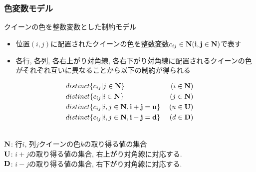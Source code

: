 \begin{frame}
    \frametitle{色変数モデル}
    
    {\footnotesize
        \alert{クイーンの色}を整数変数とした制約モデル\\
        \setlength{\abovedisplayskip}{1pt} %
        \setlength{\belowdisplayskip}{1pt} %
        \begin{block}{}
            \begin{itemize}
                \item 位置$(i, j)$に配置されたクイーンの色を整数変数$c_{ij} \in \bf N (i, j \in \bf N)$で表す
                \item \alert{各行}, \alert{各列}, \alert{各右上がり対角線}, \alert{各右下がり対角線}に配置されるクイーンの色がそれぞれ互いに異なることから以下の制約が得られる
            \end{itemize}
            \vspace{-0.5\baselineskip}           %
            \begin{eqnarray*}
& distinct\{c_{ij} | j \in \bf N\} \; & (i \in \bf N)\\
& distinct\{c_{ij} | i \in \bf N\} \; & (j \in \bf N)\\
& distinct\{c_{ij} | i, j \in \bf N,  i+j=u\} \; & (u \in \bf U)\\
& distinct\{c_{ij} | i, j \in \bf N,  i-j=d\} \; & (d \in \bf D)
            \end{eqnarray*}
        \end{block}
    }
    \\
    {\tiny
        $\bf N$: 行$i$, 列$j$クイーンの色$k$の取り得る値の集合\\
        $\bf U$: $i+j$の取り得る値の集合, 右上がり対角線に対応する.\\
        $\bf D$: $i-j$の取り得る値の集合, 右下がり対角線に対応する.\\
    }
\end{frame}






